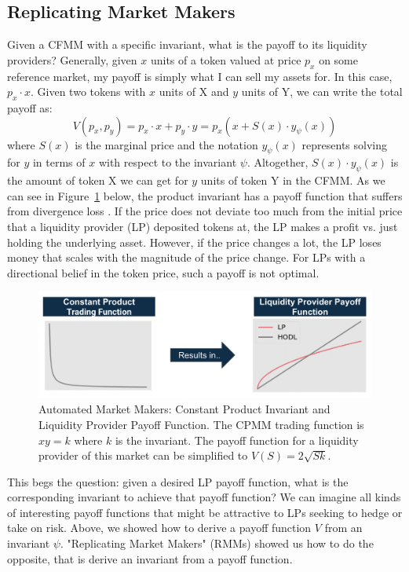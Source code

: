 \documentclass[hidelinks, 12pt]{article}
\begin{document}
\subsection{Replicating Market Makers}
\label{sec:rmm}

Given a CFMM with a specific invariant, what is the payoff to its liquidity providers? Generally, given $x$ units of a token valued at price $p_x$ on some reference market, my payoff is simply what I can sell my assets for. In this case,  $p_x \cdot x$. Given two tokens with $x$ units of X and $y$ units of Y, we can write the total payoff as:
\[V(p_x, p_y) = p_x\cdot x + p_y \cdot y = p_x (x + S(x)\cdot y_\psi(x))\]
where $S(x)$ is the marginal price and the notation $y_\psi(x)$ represents solving for $y$ in terms of $x$ with respect to the invariant $\psi$.
Altogether, $S(x)\cdot y_\psi(x)$ is the amount of token X we can get for $y$ units of token Y in the CFMM.
As we can see in Figure~\ref{fig:ammpayoff} below, the product invariant has a payoff function that suffers from divergence loss \cite{angeris2019analysis}. If the price does not deviate too much from the initial price that a liquidity provider (LP) deposited tokens at, the LP makes a profit vs. just holding the underlying asset. However, if the price changes a lot, the LP loses money that scales with the magnitude of the price change. For LPs with a directional belief in the token price, such a payoff is not optimal.

\begin{figure}[h!]
    \centering
    \includegraphics[width=0.8\linewidth]{ammpayoff.png}
    \caption{Automated Market Makers: Constant Product Invariant and Liquidity Provider Payoff Function. The CPMM trading function is $xy = k$ where $k$ is the invariant. The payoff function for a liquidity provider of this market can be simplified to $V(S) = 2\sqrt{Sk}$.}
    \label{fig:ammpayoff}
\end{figure}

This begs the question: given a desired LP payoff function, what is the corresponding invariant to achieve that payoff function? We can imagine all kinds of interesting payoff functions that might be attractive to LPs seeking to hedge or take on risk.  Above, we showed how to derive a payoff function $V$ from an invariant $\psi$. "Replicating Market Makers" (RMMs) showed us how to do the opposite, that is derive an invariant from a payoff function.
\end{document}
